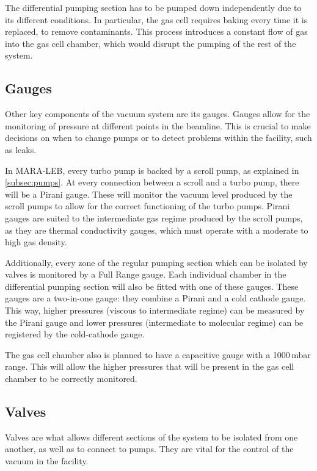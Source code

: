 The differential pumping section has to be pumped down independently due to its different conditions. In particular, the gas cell requires baking every time it is replaced, to remove contaminants. This process introduces a constant flow of gas into the gas cell chamber, which would disrupt the pumping of the rest of the system. 


\subsection{Gauges}
\label{subsec:gauges}

Other key components of the vacuum system are its gauges. Gauges allow for the monitoring of pressure at different points in the beamline. This is crucial to make decisions on when to change pumps or to detect problems within the facility, such as leaks. 

In MARA-LEB, every turbo pump is backed by a scroll pump, as explained in \autoref{subsec:pumps}. At every connection between a scroll and a turbo pump, there will be a Pirani gauge. These will monitor the vacuum level produced by the scroll pumps to allow for the correct functioning of the turbo pumps. Pirani gauges are suited to the intermediate gas regime produced by the scroll pumps, as they are thermal conductivity gauges, which must operate with a moderate to high gas density. 

Additionally, every zone of the regular pumping section which can be isolated by valves is monitored by a Full Range gauge. Each individual chamber in the differential pumping section will also be fitted with one of these gauges. These gauges are a two-in-one gauge: they combine a Pirani and a cold cathode gauge. This way, higher pressures (viscous to intermediate regime) can be measured by the Pirani gauge and lower pressures (intermediate to molecular regime) can be registered by the cold-cathode gauge.

The gas cell chamber also is planned to have a capacitive gauge with a 1000\,mbar range. This will allow the higher pressures that will be present in the gas cell chamber to be correctly monitored.

\subsection{Valves}
\label{subsec:valves}

Valves are what allows different sections of the system to be isolated from one another, as well as to connect to pumps. They are vital for the control of the vacuum in the facility.

